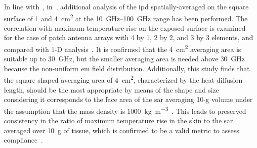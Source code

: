 In line with~\cite{Hashimoto2017On}, in~\cite{Funahashi2018Averaging}, additional analysis of the \gls{ipd} spatially-averaged on the square surface of \SI{1}{} and \SI{4}{\cm\squared} at the \SIrange[range-units=single,range-phrase=--]{10}{100}{\GHz} range has been performed.
The correlation with maximum temperature rise on the exposed surface is examined for the case of patch antenna arrays with 4 by 1, 2 by 2, and 3 by 3 elements, and compared with 1-D analysis~\cite{Foster2017Thermal}.
It is confirmed that the \SI{4}{\cm\squared} averaging area is suitable up to \SI{30}{\GHz}, but the smaller averaging area is needed above \SI{30}{\GHz} because the non-uniform \gls{em} field distribution.
Additionally, this study finds that the square shaped averaging area of \SI{4}{\cm\squared}, characterized by the heat diffusion length, should be the most appropriate by means of the shape and size considering it corresponds to the face area of the \gls{sar} averaging 10-g volume under the assumption that the mass density is \SI{1000}{\kg\per\meter\cubed}~\cite{Hirata2019Setting}.
This leads to preserved consistency in the ratio of maximum temperature rise in the skin to the \gls{sar} averaged over \SI{10}{\g} of tissue, which is confirmed to be a valid metric to assess compliance~\cite{Hirata2003Temperature,Hirata2009correlation,McIntosh2010SAR}.

